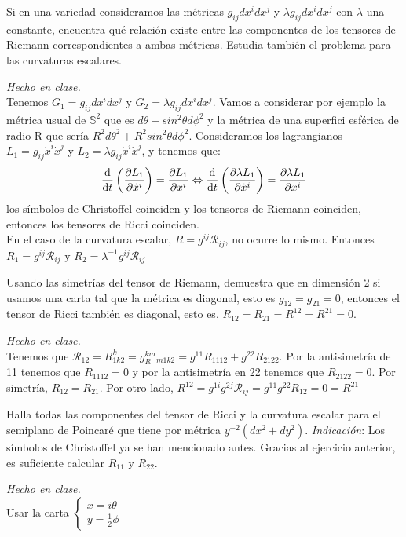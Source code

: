 \begin{problem}[12] Si en una variedad consideramos las métricas $g_{ij} dx^idx^j$
	y $\lambda g_{ij} dx^idx^j$ con $\lambda$ una constante, encuentra qué relación existe entre las componentes de los tensores de Riemann 
	correspondientes a ambas 
	métricas. Estudia también el problema para las curvaturas escalares. 
	
	\solution\textit{Hecho en clase.}\\ Tenemos $G_1=g_{ij}dx^idx^j$ y $G_2=\lambda g_{ij}dx^idx^j$. Vamos a considerar por ejemplo la métrica usual de $\mathbb{S}^2$ que es $d\theta+sin^2\theta d\phi^2$ y la métrica de una superfici esférica de radio R que sería $R^2d\theta^2+R^2sin^2\theta d\phi^2$. Consideramos los lagrangianos $L_1=g_{ij}\dot{x}^i\dot{x}^j$ y $L_2=\lambda g_{ij}\dot{x}^i\dot{x}^j$, y tenemos que: $$\dv{t}\left(\pdv{L_1}{\dot{x}^i}\right)=\pdv{L_1}{x^i}\Leftrightarrow\dv{t}\left(\pdv{\lambda L_1}{\dot{x}^i}\right)=\pdv{\lambda L_1}{x^i}$$ los símbolos de Christoffel coinciden y los tensores de Riemann coinciden, entonces los tensores de Ricci coinciden.\\
	
	En el caso de la curvatura escalar, $R=g^{ij}\mathcal{R}_{ij}$, no ocurre lo mismo. Entonces $R_1=g^{ij}\mathcal{R}_{ij}$ y $R_2=\lambda^{-1}g^{ij}\mathcal{R}_{ij}$
\end{problem}
\newpage
\begin{problem}[13] Usando las simetrías del tensor
	de Riemann, 
	demuestra que en dimensión 2 si usamos una carta tal que la métrica es diagonal, esto es $g_{12}=g_{21}=0$, entonces el tensor de Ricci también es diagonal, esto es, 
	$R_{12}=R_{21}=R^{12}=R^{21}=0$.
	
	\solution\textit{Hecho en clase.}\\ Tenemos que $\mathcal{R}_{12}=R^k_{1k2}=g^{km}_R_{m1k2}=g^{11}R_{1112}+g^{22}R_{2122}$. Por la antisimetría de 11 tenemos que $R_{1112}=0$ y por la antisimetría en 22 tenemos que $R_{2122}=0$. Por simetría, $R_{12}=R_{21}$.
		Por otro lado, $R^{12}=g^{1i}g^{2j}\mathcal{R}_{ij}=g^{11}g^{22}R_{12}=0=R^{21}$
\end{problem}

\begin{problem}[14] Halla todas las componentes del tensor de Ricci y la curvatura escalar para el semiplano
	de Poincaré que tiene por
	métrica $y^{-2}(dx^2+dy^2)$.
	\textit{Indicación}: 
	Los símbolos
	de Christoffel ya se han mencionado antes. Gracias al ejercicio anterior, es suficiente calcular $R_{11}$ y $R_{22}$.
	
	\solution\textit{Hecho en clase.}\\ Usar la carta $\begin{cases}
	x=i\theta\\
	y=\frac{1}{2}\phi
	\end{cases}$
\end{problem}
